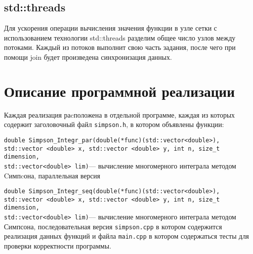 \documentclass{report}
\begin{document}
\subsection*{std::threads}
Для ускорения операции вычисления значения функции в узле сетки с использованием технологии std::threads разделим общее число узлов между потоками. Каждый из потоков выполнит свою часть задания, после чего при помощи join будет произведена синхронизация данных.

\newpage



\section*{Описание программной реализации}
Каждая реализация раcположена в отдельной программе, каждая из которых содержит заголовочный файл \verb|simpson.h|, в котором объявлены функции:
\par\verb|double Simpson_Integr_par(double(*func)(std::vector<double>),| \\\verb|std::vector <double> x, std::vector <double> y, int n, size_t dimension,|\\\verb|std::vector<double> lim)|— вычисление многомерного интеграла методом Cимпcона, параллельная версия

\par\verb|double Simpson_Integr_seq(double(*func)(std::vector<double>),| \\\verb|std::vector <double> x, std::vector <double> y, int n, size_t dimension,|\\\verb|std::vector<double> lim)|— вычисление многомерного интеграла методом Симпсона, последовательная версия
 \verb|simpson.cpp| в котором содержится реализация данных функций и файла \verb|main.cpp| в котором содержаться тесты для проверки корректности программы. 

\newpage

\end{document}
